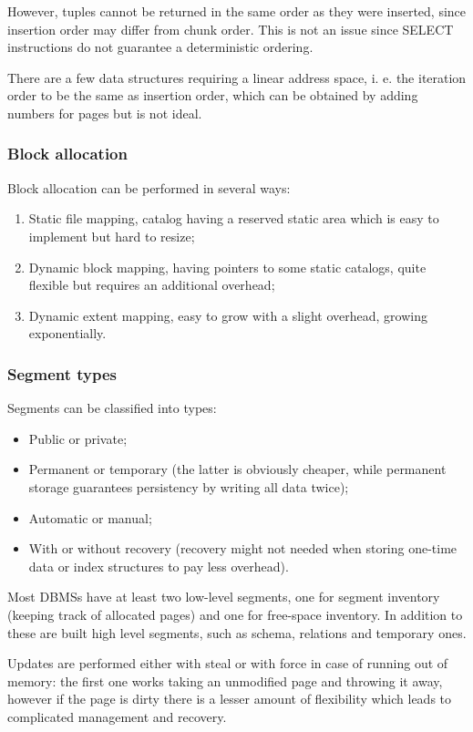 However, tuples cannot be returned in the same order as they were inserted, since insertion order may differ from chunk order. This is not an issue since SELECT instructions do not guarantee a deterministic ordering. 

There are a few data structures requiring a linear address space, i. e. the iteration order to be the same as insertion order, which can be obtained by adding numbers for pages but is not ideal. 

\subsubsection{Block allocation}
Block allocation can be performed in several ways:
\begin{enumerate}
	\item Static file mapping, catalog having a reserved static area which is easy to implement but hard to resize;
	\item Dynamic block mapping, having pointers to some static catalogs, quite flexible but requires an additional overhead;
	\item Dynamic extent mapping, easy to grow with a slight overhead, growing exponentially.
\end{enumerate}

\subsubsection{Segment types}
Segments can be classified into types:
\begin{itemize}
	\item Public or private;
	\item Permanent or temporary (the latter is obviously cheaper, while permanent storage guarantees persistency by writing all data twice);
	\item Automatic or manual;
	\item With or without recovery (recovery might not needed when storing one-time data or index structures to pay less overhead).
\end{itemize}
Most DBMSs have at least two low-level segments, one for segment inventory (keeping track of allocated pages) and one for free-space inventory. In addition to these are built high level segments, such as schema, relations and temporary ones. 

Updates are performed either with steal or with force in case of running out of memory: the first one works taking an unmodified page and throwing it away, however if the page is dirty there is a lesser amount of flexibility which leads to complicated management and recovery. 

